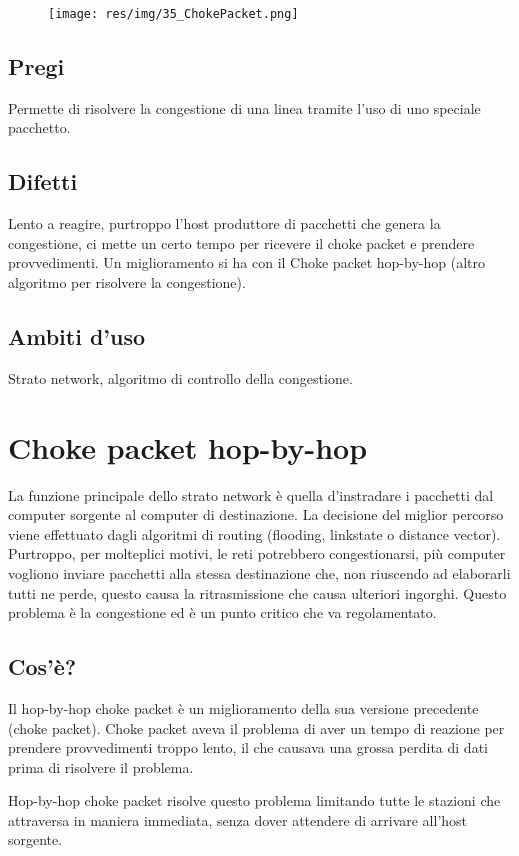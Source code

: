 \begin{figure}[H]
\centering
\texttt{[image: res/img/35\_ChokePacket.png]}
\end{figure}
\subsection{Pregi}
Permette di risolvere la congestione di una linea tramite l'uso di uno speciale pacchetto.

\subsection{Difetti}
Lento a reagire, purtroppo l'host produttore di pacchetti che genera la congestione, ci mette un certo tempo per ricevere il choke packet e prendere provvedimenti. Un miglioramento si ha con il Choke packet hop-by-hop (altro algoritmo per risolvere la congestione).

\subsection{Ambiti d'uso}
Strato network, algoritmo di controllo della congestione.

\section{Choke packet hop-by-hop}

La funzione principale dello strato network è quella d'instradare i pacchetti dal computer sorgente al computer di destinazione. La decisione del miglior percorso viene effettuato dagli algoritmi di routing (flooding, linkstate o distance vector). Purtroppo, per molteplici motivi, le reti potrebbero congestionarsi, più computer vogliono inviare pacchetti alla stessa destinazione che, non riuscendo ad elaborarli tutti ne perde, questo causa la ritrasmissione che causa ulteriori ingorghi. Questo problema è la congestione ed è un punto critico che va regolamentato.
\subsection{Cos'è?}
Il hop-by-hop choke packet è un miglioramento della sua versione precedente (choke packet).
Choke packet aveva il problema di aver un tempo di reazione per prendere provvedimenti troppo lento, il che causava una grossa perdita di dati prima di risolvere il problema.

Hop-by-hop choke packet risolve questo problema limitando tutte le stazioni che attraversa in maniera immediata, senza dover attendere di arrivare all'host sorgente.


